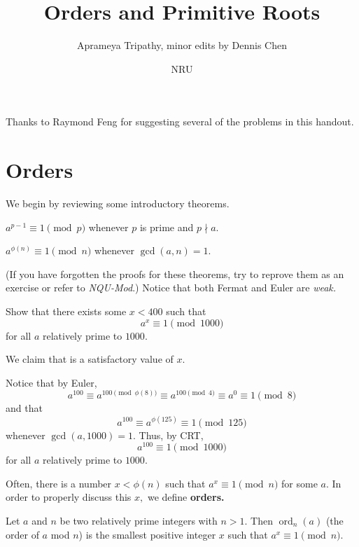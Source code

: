 \documentclass[mast]{lucky}
\title{Orders and Primitive Roots}
\author{Aprameya Tripathy, minor edits by Dennis Chen}
\date{NRU}
\begin{document}
\maketitle

Thanks to Raymond Feng for suggesting several of the problems in this handout.

\section{Orders}
We begin by reviewing some introductory theorems.

\begin{theo}[Fermat]
$a^{p-1} \equiv 1 \pmod{p}$ whenever $p$ is prime and $p \nmid a.$
\end{theo}

\begin{theo}[Euler]
$a^{\phi(n)} \equiv 1 \pmod{n}$ whenever $\gcd(a, n) = 1.$
\end{theo}

(If you have forgotten the proofs for these theorems, try to reprove them as an exercise or refer to \emph{NQU-Mod}.) Notice that both Fermat and Euler are \emph{weak.}

\begin{exam}
Show that there exists some $x < 400$ such that $$a^x \equiv 1 \pmod{1000}$$ for all $a$ relatively prime to $1000.$
\end{exam}

\begin{sol}
We claim that  is a satisfactory value of $x.$

Notice that by Euler, $$a^{100} \equiv a^{100 \pmod{\phi(8)}} \equiv a^{100 \pmod{4}} \equiv a^0 \equiv 1 \pmod{8}$$ and that $$a^{100} \equiv a^{\phi (125)} \equiv 1 \pmod{125}$$ whenever $\gcd(a, 1000) = 1.$ Thus, by CRT, $$a^{100} \equiv 1 \pmod{1000}$$ for all $a$ relatively prime to $1000.$
\end{sol}

Often, there is a number $x < \phi(n)$ such that $a^x \equiv 1 \pmod{n}$ for some $a.$ In order to properly discuss this $x,$ we define \textbf{orders.}

\begin{defi}[Orders]
Let $a$ and $n$ be two relatively prime integers with $n>1.$ Then $\operatorname{ord}_n(a)$ (the order of $a$ mod $n$) is the smallest positive integer $x$ such that $a^x \equiv 1 \pmod{n}.$
\end{defi}
\end{document}
